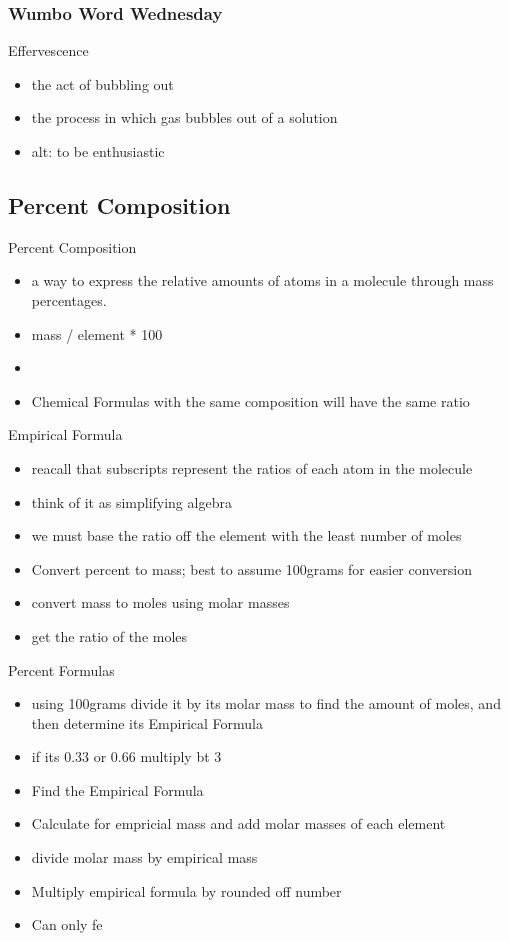 \documentclass{article}
\begin{document}
\subsubsection{Wumbo Word Wednesday}

Effervescence
\begin{itemize}
    \item the act of bubbling out
    \item the process in which gas bubbles out of a solution
    \item alt: to be enthusiastic
\end{itemize}

\subsection*{Percent Composition}
Percent Composition
\begin{itemize}
    \item a way to express the relative amounts of atoms in a molecule through mass percentages.
    \item mass / element * 100
    \item {}
    \item Chemical Formulas with the same composition will have the same ratio
\end{itemize}
Empirical Formula
\begin{itemize}
    \item reacall that subscripts represent the ratios of each atom in the molecule
    \item think of it as simplifying algebra
    \item we must base the ratio off the element with the least number of moles
    \item Convert percent to mass; best to assume 100grams for easier conversion
    \item convert mass to moles using molar masses
    \item get the ratio of the moles
\end{itemize}
Percent Formulas
\begin{itemize}
    \item using 100grams divide it by its molar mass to find the amount of moles, and then determine its Empirical Formula
    \item if its 0.33 or 0.66 multiply bt 3
    \item Find the Empirical Formula
    \item Calculate for empricial mass and add molar masses of each element
    \item divide molar mass by empirical mass
    \item Multiply empirical formula by rounded off number
    \item Can only fe
\end{itemize}
\end{document}
